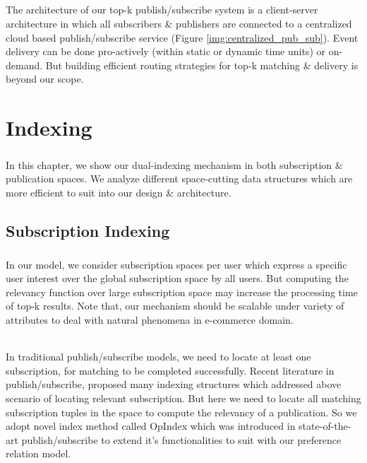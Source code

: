 \documentclass[a4paper,12pt,oneside]{book}
\theoremstyle{definition}
\theoremstyle{remark}
\begin{document}
\paragraph*{}
The architecture of our top-k publish/subscribe system is a client-server architecture in which all subscribers \& publishers are connected to a centralized cloud based publish/subscribe service (Figure \ref{img:centralized_pub_sub}). Event delivery can be done pro-actively (within static or dynamic time units) or on-demand. But building efficient routing strategies for top-k matching \& delivery is beyond our scope.
 
\chapter{Indexing}
\paragraph*{}
In this chapter, we show our dual-indexing mechanism in both subscription \& publication spaces. We analyze different space-cutting data structures which are more efficient to suit into our design \& architecture.

\section{Subscription Indexing}
\label{sec:sub_index}
\paragraph*{}
In our model, we consider subscription spaces per user which express a specific user interest over the global subscription space by all users. But computing the relevancy function over large subscription space may increase the processing time of top-k results. Note that, our mechanism should be scalable under variety of attributes to deal with natural phenomena in e-commerce domain.
\subparagraph*{}
In traditional publish/subscribe models, we need to locate at least one subscription, for matching to be completed successfully. Recent literature in publish/subscribe, proposed many indexing structures which addressed above scenario of locating relevant subscription. But here we need to locate all matching subscription tuples in the space to compute the relevancy of a publication. So we adopt novel index method called OpIndex \cite{Zhang2014} which was introduced in state-of-the-art publish/subscribe to extend it's functionalities to suit with our preference relation model. 
\end{document}
